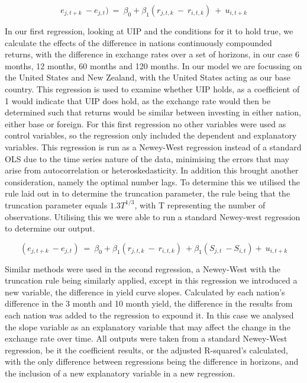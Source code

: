 \documentclass[10pt]{article}
\begin{document}
\begin{equation}
e_{j,t+k}\ -e_{j,t})\ =\ \beta_0+\beta_1(r_{j,t,k}\ -\ r_{i,t,k})\ +\ u_{i,t+k}
\end{equation}

In our first regression, looking at UIP and the conditions for it to hold true, we calculate the effects of the difference in nations continuously compounded returns, with the difference in exchange rates over a set of horizons, in our case 6 months, 12 months, 60 months and 120 months. In our model we are focussing on the United States and New Zealand, with the United States acting as our base country. This regression is used to examine whether UIP holds, as a coefficient of 1 would indicate that UIP does hold, as the exchange rate would then be determined such that returns would be similar between investing in either nation, either base or foreign. For this first regression no other variables were used as control variables, so the regression only included the dependent and explanatory variables. This regression is run as a Newey-West regression instead of a standard OLS due to the time series nature of the data, minimising the errors that may arise from autocorrelation or heteroskedasticity. In addition this brought another consideration, namely the optimal number lags. To determine this we utilised the rule laid out in \cite{lazarus2018har} to determine the truncation parameter, the rule being that the truncation parameter equals $1.3T^{1/3}$, with T representing the number of observations. Utilising this we were able to run a standard Newey-west regression to determine our output.

\begin{equation}
(e_{j,t+k}\ -e_{j,t})\ =\ \beta_0+\beta_1(r_{j,t,k}\ -\ r_{i,t,k})\ +\beta_1(S_{j,t}\ -S_{i,t})+\ u_{i,t+k}
\end{equation}

Similar methods were used in the second regression, a Newey-West with the truncation rule being similarly applied, except in this regression we introduced a new variable, the difference in yield curve slopes. Calculated by each nation's difference in the 3 month and 10 month yield, the difference in the results from each nation was added to the regression to expound it. In this case we analysed the slope variable as an explanatory variable that may affect the change in the exchange rate over time. All outputs were taken from a standard Newey-West regression, be it the coefficient results, or the adjusted R-squared’s calculated, with the only difference between regressions being the difference in horizons, and the inclusion of a new explanatory variable in a new regression.
\end{document}
